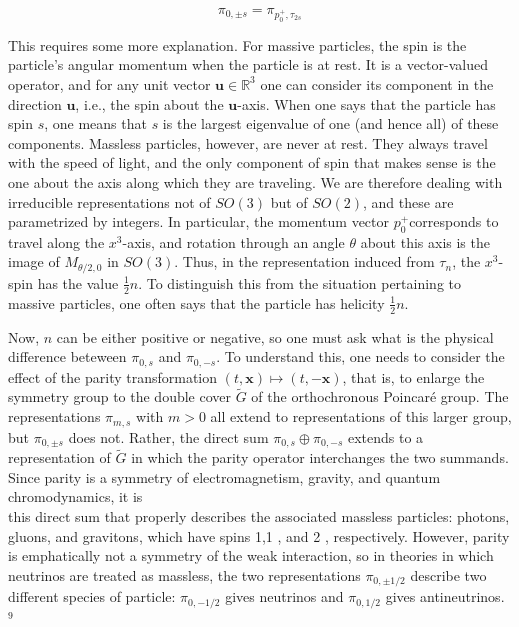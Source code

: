 \documentclass[10pt, letterpaper]{article}
\begin{document}
$$
\pi_{0, \pm s}=\pi_{p_{0}^{+}, \tau_{2 s}}
$$

This requires some more explanation. For massive particles, the spin is the particle's angular momentum when the particle is at rest. It is a vector-valued operator, and for any unit vector $\mathbf{u} \in \mathbb{R}^{3}$ one can consider its component in the direction $\mathbf{u}$, i.e., the spin about the $\mathbf{u}$-axis. When one says that the particle has spin $s$, one means that $s$ is the largest eigenvalue of one (and hence all) of these components. Massless particles, however, are never at rest. They always travel with the speed of light, and the only component of spin that makes sense is the one about the axis along which they are traveling. We are therefore dealing with irreducible representations not of $S O(3)$ but of $S O(2)$, and these are parametrized by integers. In particular, the momentum vector $p_{0}^{+}$corresponds to travel along the $x^{3}$-axis, and rotation through an angle $\theta$ about this axis is the image of $M_{\theta / 2,0}$ in $S O(3)$. Thus, in the representation induced from $\tau_{n}$, the $x^{3}$-spin has the value $\frac{1}{2} n$. To distinguish this from the situation pertaining to massive particles, one often says that the particle has helicity $\frac{1}{2} n$.

Now, $n$ can be either positive or negative, so one must ask what is the physical difference beteween $\pi_{0, s}$ and $\pi_{0,-s}$. To understand this, one needs to consider the effect of the parity transformation $(t, \mathbf{x}) \mapsto(t,-\mathbf{x})$, that is, to enlarge the symmetry group to the double cover $\widetilde{G}$ of the orthochronous Poincaré group. The representations $\pi_{m, s}$ with $m>0$ all extend to representations of this larger group, but $\pi_{0, \pm s}$ does not. Rather, the direct sum $\pi_{0, s} \oplus \pi_{0,-s}$ extends to a representation of $\widetilde{G}$ in which the parity operator interchanges the two summands. Since parity is a symmetry of electromagnetism, gravity, and quantum chromodynamics, it is\\
this direct sum that properly describes the associated massless particles: photons, gluons, and gravitons, which have spins 1,1 , and 2 , respectively. However, parity is emphatically not a symmetry of the weak interaction, so in theories in which neutrinos are treated as massless, the two representations $\pi_{0, \pm 1 / 2}$ describe two different species of particle: $\pi_{0,-1 / 2}$ gives neutrinos and $\pi_{0,1 / 2}$ gives antineutrinos. ${ }^{9}$
\end{document}

